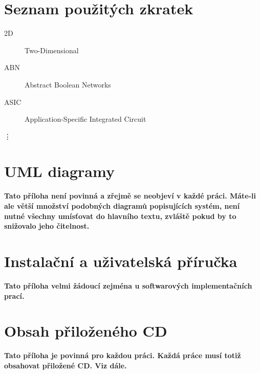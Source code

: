 \documentclass[11pt,twoside,a4paper]{book}
\begin{document}

\chapter{Seznam použitých zkratek}

\begin{description}
\item[2D] Two-Dimensional
\item[ABN] Abstract Boolean Networks
\item[ASIC] Application-Specific Integrated Circuit
\end{description}
\vdots

\chapter{UML diagramy}
\textbf{\large Tato příloha není povinná a zřejmě se neobjeví v každé práci. Máte-li ale větší množství podobných diagramů popisujících systém, není nutné všechny umísťovat do hlavního textu, zvláště pokud by to snižovalo jeho čitelnost.}

\chapter{Instalační a uživatelská příručka}
\textbf{\large Tato příloha velmi žádoucí zejména u softwarových implementačních prací.}

\chapter{Obsah přiloženého CD}
\textbf{\large Tato příloha je povinná pro každou práci. Každá práce musí totiž obsahovat přiložené CD. Viz dále.}
\end{document}
